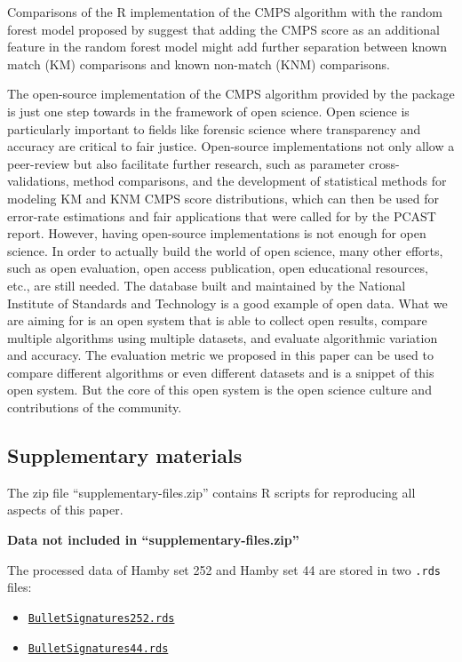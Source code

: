 Comparisons of the R implementation of the CMPS algorithm with the
random forest model proposed by \citet{aoas} suggest that adding the
CMPS score as an additional feature in the random forest model might add
further separation between known match (KM) comparisons and known
non-match (KNM) comparisons.

The open-source implementation of the CMPS algorithm provided by the
 package is just one step towards in the framework of open
science. Open science is particularly important to fields like forensic
science where transparency and accuracy are critical to fair justice.
Open-source implementations not only allow a peer-review but also
facilitate further research, such as parameter cross-validations, method
comparisons, and the development of statistical methods for modeling KM
and KNM CMPS score distributions, which can then be used for error-rate
estimations and fair applications that were called for by the PCAST
\citep{pcast} report. However, having open-source implementations is not
enough for open science. In order to actually build the world of open
science, many other efforts, such as open evaluation, open access
publication, open educational resources, etc., are still needed. The
database built and maintained by the National Institute of Standards and
Technology is a good example of open data. What we are aiming for is an
open system that is able to collect open results, compare multiple
algorithms using multiple datasets, and evaluate algorithmic variation
and accuracy. The evaluation metric we proposed in this paper can be
used to compare different algorithms or even different datasets and is a
snippet of this open system. But the core of this open system is the
open science culture and contributions of the community.

\hypertarget{supplementary-materials}{%
\subsection{Supplementary materials}\label{supplementary-materials}}

The zip file ``supplementary-files.zip'' contains R scripts for
reproducing all aspects of this paper.

\textbf{Data not included in ``supplementary-files.zip''}

The processed data of Hamby set 252 and Hamby set 44 are stored in two
\texttt{.rds} files:

\begin{itemize}
\tightlist
\item
  \href{https://github.com/willju-wangqian/CMPSpaper/blob/main/reproducible/bullet_signatures_etc/BulletSignatures252.rds}{\texttt{BulletSignatures252.rds}}
\item
  \href{https://github.com/willju-wangqian/CMPSpaper/blob/main/reproducible/bullet_signatures_etc/BulletSignatures44.rds}{\texttt{BulletSignatures44.rds}}
\end{itemize}

